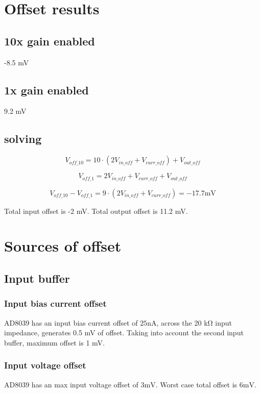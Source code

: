 \documentclass[11pt]{article}
\begin{document}
\section{Offset results}
\subsection{10x gain enabled}
-8.5 \si{\milli \volt}

\subsection{1x gain enabled}
9.2 \si{\milli \volt}

\subsection{solving}

\begin{equation}
  V_{off\_10} = 10 \cdot (2 V_{in\_off} + V_{curr\_off}) + V_{out\_off}
\end{equation}

\begin{equation}
  V_{off\_1} = 2 V_{in\_off} + V_{curr\_off} + V_{out\_off}
\end{equation}

\begin{equation}
  V_{off\_10} - V_{off\_1}  = 9 \cdot (2 V_{in\_off} + V_{curr\_off}) = -17.7 \si{\milli \volt}
\end{equation}

Total input offset is -2 \si{\milli \volt}.
Total output offset is 11.2 \si{\milli \volt}.


\section{Sources of offset}
\subsection{Input buffer}
\subsubsection{Input bias current offset}
AD8039 has an input bias current offset of $25 \si{\nano \ampere}$, across the 20 \si{\kilo \ohm}
input impedance, generates 0.5 mV of offset. Taking into account the second input buffer, maximum offset 
is 1 mV.

\subsubsection{Input voltage offset}
AD8039 has an max input voltage offset of $3 \si{\milli \volt}$.
Worst case total offset is $6 \si{\milli \volt}$.
\end{document}
